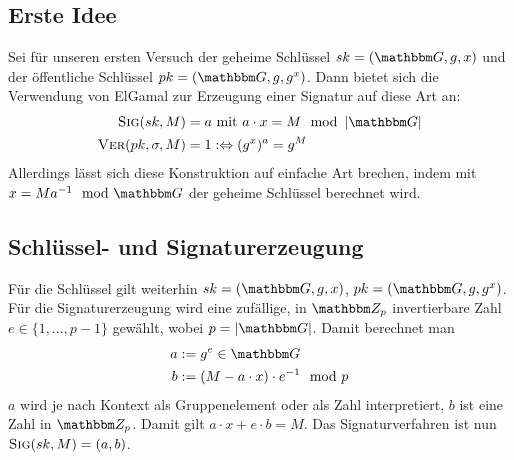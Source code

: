 \subsection{Erste Idee}
Sei für unseren ersten Versuch der geheime Schlüssel $\skey = (\G, g,
x)$ und der öffentliche Schlüssel $\pkey = (\G, g, g^x)$. Dann bietet
sich die Verwendung von ElGamal zur Erzeugung einer Signatur auf diese
Art an: 
\begin{align*}
\sig(\skey,M) &= a \text{ mit } a \cdot x = M \mod \left|\G\right|\\
\ver(\pkey,\sigma,M) &= 1 :\Leftrightarrow (g^x)^a = g^M
\end{align*}
Allerdings lässt sich diese Konstruktion auf einfache Art brechen, indem
mit $x = M a^{-1} \mod \G$ der geheime Schlüssel berechnet wird. 

\subsection{Schlüssel- und Signaturerzeugung}
Für die Schlüssel gilt weiterhin $\skey = (\G, g,
x)$, $\pkey = (\G, g, g^x)$. 
Für die Signaturerzeugung wird eine zufällige, in $\Z{p}$ invertierbare
Zahl $e \in \{1, \dots, p - 1\}$ gewählt,
wobei $p=|\G|$. Damit berechnet man 
\begin{align*}
a &:= g^e \in \G\\
b &:= (M - a \cdot x) \cdot e^{-1} \mod p
\end{align*}
$a$ wird je nach Kontext als Gruppenelement oder als Zahl interpretiert, $b$
ist eine Zahl in $\Z{p}$.  
Damit gilt $a \cdot x + e \cdot b = M$. Das Signaturverfahren ist nun
$\textsc{Sig}(sk,M) = (a, b)$.

